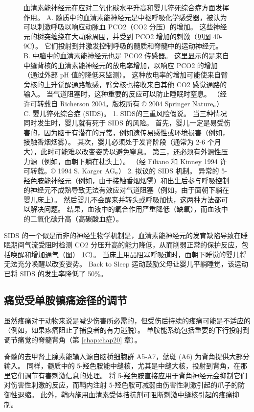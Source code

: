 \begin{figure}[htbp]
	\caption{血清素能神经元在应对二氧化碳水平升高和婴儿猝死综合症方面发挥作用。 A. 髓质中的血清素能神经元是中枢呼吸化学感受器，被认为可以刺激呼吸以响应动脉血 PCO2（CO2 分压）的增加。 这些神经元的树突缠绕在大动脉周围，并受到 PCO2 增加的刺激（见图 40-9C）。 它们投射到并激发控制呼吸的髓质和脊髓中的运动神经元。 B. 中脑中的血清素能神经元也是 PCO2 传感器。 这里显示的是来自中缝背核的血清素能神经元的放电率增加，以响应 PCO2 的增加（通过外部 pH 值的降低来监测）。 这种放电率的增加可能使来自臂旁核的上升觉醒通路敏感，臂旁核也接收来自其他 CO2 感觉通路的输入。 当气道阻塞时，这种重要的反应可以防止睡眠时窒息。 （经许可转载自 Richerson 2004。版权所有 © 2004 Springer Nature。） C. 婴儿猝死综合症 (SIDS)。 1. SIDS的三重风险假说。 当三种情况同时发生时，婴儿就有死于 SIDS 的风险。 首先，婴儿一定是易受伤害的，因为脑干有潜在的异常，例如遗传易感性或环境损害（例如，接触香烟烟雾）。 其次，婴儿必须处于发育阶段（通常为 2-6 个月大），此时可能难以改变姿势以避免窒息。 第三，还必须有外源性压力源（例如，面朝下躺在枕头上）。 （经 Filiano 和 Kinney 1994 许可转载。© 1994 S. Karger AG。） 2. 拟议的 SIDS 机制。 异常的 5-羟色胺能神经元（例如，由于接触香烟烟雾）和出生后参与呼吸控制的神经元不成熟导致无法有效应对气道阻塞（例如，由于面朝下躺在婴儿床上）。 然后婴儿不会醒来并转头或呼吸加快，这两种方法都可以解决问题。 结果，血液中的氧合作用严重降低（缺氧），而血液中的二氧化碳升高（高碳酸血症）。}
	\label{fig:40_13}
\end{figure}

SIDS 的一个似是而非的神经生物学机制是，血清素能神经元的发育缺陷导致在睡眠期间气流受阻时检测 CO2 分压升高的能力降低，从而削弱正常的保护反应，包括唤醒和增加通气（图） \ref{fig:40_13}C）。 当床上用品阻塞呼吸道时，面朝下睡觉的婴儿将无法充分唤醒以改变姿势。 Back to Sleep 运动鼓励父母让婴儿平躺睡觉，该运动已将 SIDS 的发生率降低了 50\%。

\subsection{痛觉受单胺镇痛途径的调节}
虽然疼痛对于动物来说是减少伤害所必需的，但受伤后持续的疼痛可能是不适应的（例如，如果疼痛阻止了捕食者的有力逃脱）。 单胺能系统包括重要的下行投射到调节痛觉的脊髓背角（第 \ref{chap:chap20} 章）。

脊髓的去甲肾上腺素能输入源自脑桥细胞群 A5-A7，蓝斑 (A6) 为背角提供大部分输入。 同样，髓质中的 5-羟色胺能中缝核，尤其是中缝大核，投射到背角，在那里它们调节有害刺激信息的处理。 将 5-羟色胺直接应用于背角神经元会抑制它们对伤害性刺激的反应，而鞘内注射 5-羟色胺可减弱由伤害性刺激引起的爪子的防御性退缩。 此外，鞘内施用血清素受体拮抗剂可阻断刺激中缝核引起的疼痛抑制。

